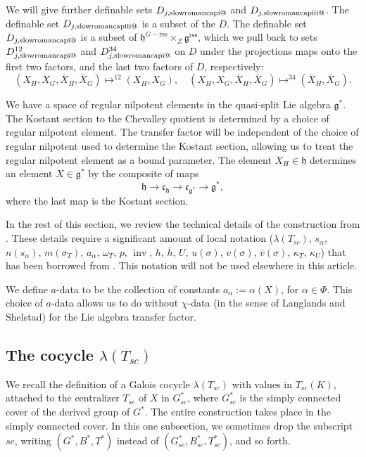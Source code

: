 \documentclass[12pt]{amsart}
\makeatletter
\newcommand*{\rom}[1]{\text{\expandafter\@slowromancap\romannumeral #1@}}
\newcommand{\op}[1]{\operatorname{#1}}
\newcommand{\fg}{\mathfrak{g}}
\newcommand{\fc}{\mathfrak{c}}
\newcommand{\fh}{\mathfrak{h}}
\newcommand{\reg}{\mathrm{rss}}
\theoremstyle{plain}
\theoremstyle{definition}
\makeatother
\begin{document}
We will give further definable sets $D_{j,{\rom{1}}}$ and
$D_{j,\rom{3}}$.  The definable set $D_{j,\rom{3}}$ is a subset of the
$D$.  The definable set
$D_{j,\rom{1}}$ is a subset of $\fh^{G-\reg}\times_Z\fg^\reg$, which
we pull back to sets $D^{12}_{j,\rom1}$ and $D^{34}_{j,\rom1}$ on
$D$ under the projections maps onto the first two
factors, and the last two factors of $D$,
respectively:
\[
(X_H,X_G,\bar X_H,\bar X_G)\mapsto^{12} (X_H,X_G),\quad
(X_H,X_G,\bar X_H,\bar X_G)\mapsto^{34} (\bar X_H,\bar X_G).
\]

We have a space of regular nilpotent elements in the quasi-split Lie
algebra $\fg^*$.  The Kostant section \cite{Kott} to the Chevalley
quotient is determined by a choice of regular nilpotent element.  The
transfer factor will be independent of the choice of regular nilpotent
used to determine the Kostant section, allowing us to treat the
regular nilpotent element as a bound parameter.  The element $X_H\in
\fh$ determines an element $X\in \fg^*$ by the composite of maps
\[
\fh \to \fc_{\fh} \to \fc_{\fg^*} \to \fg^*,
\]
where the last map is the Kostant section.  


In the rest of this section, we review the technical details of the
construction from \cite{LSxf}.  These details require a significant
amount of local notation ($\lambda(T_{sc})$, $s_\alpha$, $n(s_\alpha)$,
$m(\sigma_T)$, $a_\alpha$, $\omega_T$, $p$, $\op{inv}$, $h$, $\bar h$,
$U$, $u(\sigma)$, $v(\sigma)$, $\bar v(\sigma)$, $\kappa_T$,
$\kappa_U$) that has been borrowed from \cite{LSxf}.  This notation
will not be used elsewhere in this article.

We define $a$-data to be the collection of constants $a_\alpha:=
\alpha(X)$, for $\alpha\in \Phi$.  This choice of $a$-data allows us
to do without $\chi$-data (in the sense of Langlands and Shelstad) for
the Lie algebra transfer factor.



\subsection{The cocycle $\lambda(T_{sc})$}

We recall the definition of a Galois cocycle $\lambda(T_{sc})$ with
values in $T_{sc}(K)$, attached to the centralizer $T_{sc}$ of $X$ in
$G^*_{sc}$, where $G^*_{sc}$ is the simply connected cover of the
derived group of $G^*$.  The entire construction takes place in the
simply connected cover.  In this one subsection, we
sometimes drop the subscript ${sc}$, writing $(G^*,B^*,T^*)$ instead
of $(G^*_{sc},B^*_{sc},T^*_{sc})$, and so forth.
\end{document}

